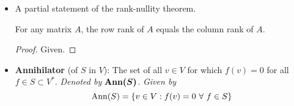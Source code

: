 \documentclass[../notes.tex]{subfiles}
\begin{document}
\begin{itemize}
\begin{theorem}
        \begin{proof}
            Given.
        \end{proof}
    \end{theorem}
    \item A partial statement of the rank-nullity theorem.
    \begin{corollary}\label{cly:11.21}
        For any matrix $A$, the row rank of $A$ equals the column rank of $A$.
        \begin{proof}
            Given.
        \end{proof}
    \end{corollary}
    \item \textbf{Annihilator} (of $S$ in $V$): The set of all $v\in V$ for which $f(v)=0$ for all $f\in S\subset V^*$. \emph{Denoted by} $\bm{\Ann(S)}$. \emph{Given by}
    \begin{equation*}
        \operatorname{Ann}(S) = \{v\in V:f(v)=0\ \forall\ f\in S\}
    \end{equation*}
\end{itemize}
\setcounter{proposition}{0}
\end{document}
